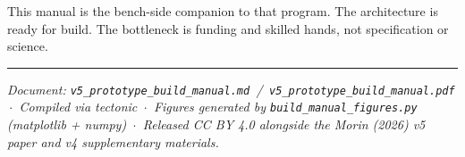 \documentclass[11pt,letterpaper]{article}
\begin{document}
This manual is the bench-side companion to that program. The architecture is ready for build. The bottleneck is funding and skilled hands, not specification or science.

\vspace{1em}
\hrule
\vspace{0.5em}

\noindent\textit{Document: \texttt{v5\_prototype\_build\_manual.md} \,/\, \texttt{v5\_prototype\_build\_manual.pdf} \,$\cdot$\, Compiled via tectonic \,$\cdot$\, Figures generated by \texttt{build\_manual\_figures.py} (matplotlib + numpy) \,$\cdot$\, Released CC BY 4.0 alongside the Morin (2026) v5 paper and v4 supplementary materials.}
\end{document}
